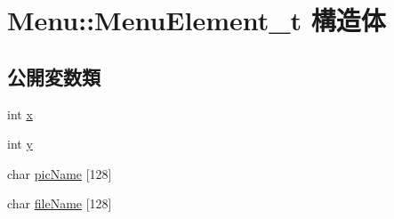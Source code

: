 \hypertarget{struct_menu_1_1_menu_element__t}{\section{Menu\+:\+:Menu\+Element\+\_\+t 構造体}
\label{struct_menu_1_1_menu_element__t}
}
\subsection*{公開変数類}
\begin{DoxyCompactItemize}
\item 
int \hyperlink{struct_menu_1_1_menu_element__t_a32951f293ee164b34c17d78f430ff4df}{x}
\item 
int \hyperlink{struct_menu_1_1_menu_element__t_a2d2fd0d65e8c8d9bdbf43bd9647b99c9}{y}
\item 
char \hyperlink{struct_menu_1_1_menu_element__t_aba2866f80e22a37cb7657e5344308b2b}{pic\+Name} \mbox{[}128\mbox{]}
\item 
char \hyperlink{struct_menu_1_1_menu_element__t_ab24c449e97323b9f4e91d1e8e19db008}{file\+Name} \mbox{[}128\mbox{]}
\end{DoxyCompactItemize}


